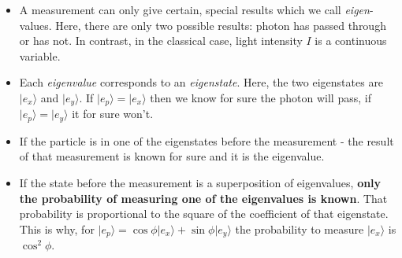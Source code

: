 \documentclass{Textbook}
\begin{document}
\begin{itemize}
\item A measurement can only give certain, special results which we call \emph{eigen}-values. Here, there are only two possible results: photon has passed through or has not. In contrast, in the classical case, light intensity $I$ is a continuous variable.
\item Each \emph{eigenvalue} corresponds to an \emph{eigenstate}. Here, the two eigenstates are $\vert e_x \rangle$ and $\vert e_y \rangle$. If $\vert e_p \rangle = \vert e_x \rangle$ then we know for sure the photon will pass, if $\vert e_p \rangle = \vert e_y \rangle$ it for sure won't. 
\item If the particle is in one of the eigenstates before the measurement - the result of that measurement is known for sure and it is the eigenvalue.
\item If the state before the measurement is a superposition of eigenvalues, \textbf{only the probability of measuring one of the eigenvalues is known}. That probability is proportional to the square of the coefficient of that eigenstate. This is why, for $\vert e_p \rangle = \cos\phi \vert e_x \rangle + \sin \phi \vert e_y \rangle$ the probability to measure $\vert e_x \rangle$ is $\cos^2\phi$.
\end{itemize}
\end{document}

